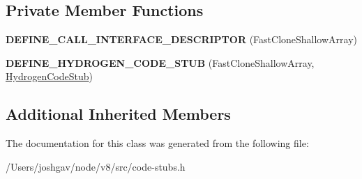 \subsection*{Private Member Functions}
\begin{DoxyCompactItemize}
\item 
{\bfseries D\+E\+F\+I\+N\+E\+\_\+\+C\+A\+L\+L\+\_\+\+I\+N\+T\+E\+R\+F\+A\+C\+E\+\_\+\+D\+E\+S\+C\+R\+I\+P\+T\+OR} (Fast\+Clone\+Shallow\+Array)\hypertarget{classv8_1_1internal_1_1_fast_clone_shallow_array_stub_aa03f2167e9d94c2ba33812a07d240848}{}\label{classv8_1_1internal_1_1_fast_clone_shallow_array_stub_aa03f2167e9d94c2ba33812a07d240848}

\item 
{\bfseries D\+E\+F\+I\+N\+E\+\_\+\+H\+Y\+D\+R\+O\+G\+E\+N\+\_\+\+C\+O\+D\+E\+\_\+\+S\+T\+UB} (Fast\+Clone\+Shallow\+Array, \hyperlink{classv8_1_1internal_1_1_hydrogen_code_stub}{Hydrogen\+Code\+Stub})\hypertarget{classv8_1_1internal_1_1_fast_clone_shallow_array_stub_a82f23bd798d33689c6243c3c26408fce}{}\label{classv8_1_1internal_1_1_fast_clone_shallow_array_stub_a82f23bd798d33689c6243c3c26408fce}

\end{DoxyCompactItemize}
\subsection*{Additional Inherited Members}


The documentation for this class was generated from the following file\+:\begin{DoxyCompactItemize}
\item 
/\+Users/joshgav/node/v8/src/code-\/stubs.\+h\end{DoxyCompactItemize}
